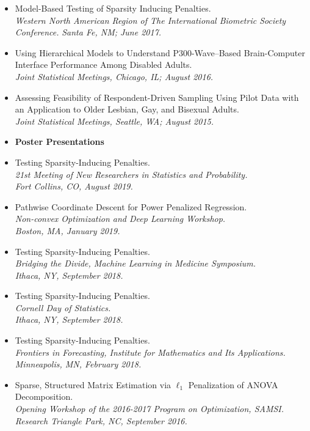 \documentclass[11pt]{article}
\newcommand{\tab}{\hspace*{2em}}
\begin{document}
\begin{itemize}
	\item[] Model-Based Testing of Sparsity Inducing Penalties. \\
	\tab \emph{Western North American Region of The International Biometric Society Conference.}
	\tab \emph{Santa Fe, NM; June 2017.} \vspace{-2mm}
	\item[] Using Hierarchical Models to Understand P300-Wave--Based Brain-Computer Interface Performance Among Disabled Adults. \\
	\tab \emph{Joint Statistical Meetings, Chicago, IL; August 2016.} \vspace{-2mm}
	\item[] Assessing Feasibility of Respondent-Driven Sampling Using Pilot Data with an Application to Older Lesbian, Gay, and Bisexual Adults. \\
	\tab \emph{Joint Statistical Meetings, Seattle, WA; August 2015.} 
	\item[] \textbf{Poster Presentations}\vspace{-2mm}
	\item[] Testing Sparsity-Inducing Penalties. \\
	\tab \emph{21st Meeting of New Researchers in 
Statistics and Probability.}\\ 
	\tab \emph{Fort Collins, CO, August 2019.} \vspace{-2mm}
	\item[] Pathwise Coordinate Descent for Power Penalized Regression. \\
	\tab \emph{Non-convex Optimization and Deep Learning Workshop.}\\ 
	\tab \emph{Boston, MA, January 2019.} \vspace{-2mm}
	\item[] Testing Sparsity-Inducing Penalties. \\
	\tab \emph{Bridging the Divide, Machine Learning in Medicine Symposium.}\\ 
	\tab \emph{Ithaca, NY, September 2018.} \vspace{-2mm}
	\item[] Testing Sparsity-Inducing Penalties. \\
	\tab \emph{Cornell Day of Statistics.}\\ 
	\tab \emph{Ithaca, NY, September 2018.} \vspace{-2mm}
	\item[] Testing Sparsity-Inducing Penalties. \\
	\tab \emph{Frontiers in Forecasting, Institute for Mathematics and Its Applications.}\\ 
	\tab \emph{Minneapolis, MN, February 2018.} \vspace{-2mm}
	\item[] Sparse, Structured Matrix Estimation via $\ell_1$ Penalization of ANOVA Decomposition. \\
	\tab \emph{Opening Workshop of the 2016-2017 Program on Optimization, SAMSI.}\\ 
	\tab \emph{Research Triangle Park, NC, September 2016.}
\end{itemize}
\end{document}
